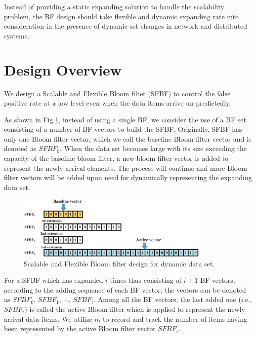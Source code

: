\documentclass[10pt,journal,letterpaper]{IEEEtran}
\newcommand{\rev}[1]{\uwave{#1}}
\begin{document}
Instead of providing a static expanding solution to handle the scalability problem, the BF design should take flexible and dynamic expanding rate into consideration in the presence of  dynamic set changes in network and distributed systems.




\section{Design Overview}
\label{sec:Scalable and rate-dependent bloom filter}
We design a Scalable and Flexible Bloom filter (SFBF) to control the false positive rate at a low level even when the data items arrive un-predictedly.

As shown in Fig.\ref{fig:Scalable bloom filter design for dynamic MCC}, instead of using a single BF, we consider the use of a BF set consisting of a number of BF vectors to build the SFBF. Originally, SFBF has only one Bloom filter vector, which we call the baseline Bloom filter vector and is denoted as $SFBF_0$. When the data set becomes large with its size exceeding the capacity of the baseline bloom filter, a new bloom filter vector is added to represent the newly arrival elements. The process will continue and more Bloom filter vectors will be added  upon need  for dynamically representing the expanding data set.

\begin{figure}[!h]
\centering
\includegraphics[width=3.7in]{fig/sbf}
\caption{ Scalable and Flexible Bloom filter design for dynamic data set.}
\label{fig:Scalable bloom filter design for dynamic MCC}
\end{figure}
For a SFBF which has expanded $i$ times thus consisting of $i+1$ BF vectors, according to the adding sequence of each BF vector, the vectors can be denoted as $SFBF_0$, $SFBF_1$, $\cdots$, $SFBF_i$.
Among all the BF vectors,  the last added one (i.e.,$SFBF_i$) is called the active Bloom filter which is applied to represent the newly arrival data items. We  utilize $n_l$ to record and track the number of items having been represented by the active Bloom filter vector $SFBF_i$.%
\end{document}
